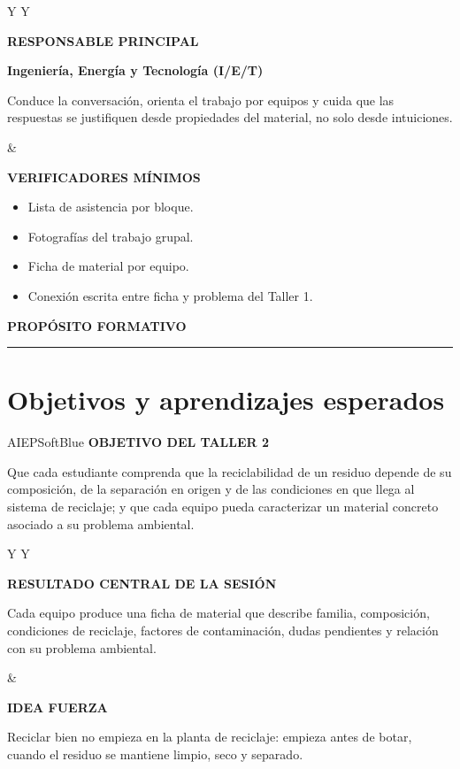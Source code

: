 ﻿\documentclass[10pt,a4paper]{article}
\newcommand{\kicker}[1]{%
  {\color{AIEPRed}\scriptsize\bfseries\MakeUppercase{#1}}\par\vspace{2.5mm}
  {\color{AIEPRed}\rule{13mm}{1.2pt}}\vspace{3mm}
}
\newcommand{\labeltext}[1]{%
  {\scriptsize\bfseries\color{AIEPSlate}\MakeUppercase{#1}}\par\vspace{1.3mm}
}
\newcommand{\pagebreaksection}{\newpage}
\begin{document}
\vspace{4mm}
\begin{tabularx}{\textwidth}{Y Y}
\begin{card}[height=35mm,valign=top]
\labeltext{Responsable principal}
{\bfseries\color{AIEPNavy}Ingeniería, Energía y Tecnología (I/E/T)}\par
Conduce la conversación, orienta el trabajo por equipos y cuida que las respuestas se justifiquen desde propiedades del material, no solo desde intuiciones.
\end{card}
&
\begin{card}[height=35mm,valign=top]
\labeltext{Verificadores mínimos}
\begin{itemize}
  \item Lista de asistencia por bloque.
  \item Fotografías del trabajo grupal.
  \item Ficha de material por equipo.
  \item Conexión escrita entre ficha y problema del Taller 1.
\end{itemize}
\end{card}
\end{tabularx}

\pagebreaksection

\kicker{Propósito formativo}
\section*{Objetivos y aprendizajes esperados}

\begin{softcard}{AIEPSoftBlue}
\labeltext{Objetivo del Taller 2}
Que cada estudiante comprenda que la reciclabilidad de un residuo depende de su composición, de la separación en origen y de las condiciones en que llega al sistema de reciclaje; y que cada equipo pueda caracterizar un material concreto asociado a su problema ambiental.
\end{softcard}

\vspace{3mm}
\begin{tabularx}{\textwidth}{Y Y}
\begin{card}[height=27mm,valign=top]
\labeltext{Resultado central de la sesión}
Cada equipo produce una ficha de material que describe familia, composición, condiciones de reciclaje, factores de contaminación, dudas pendientes y relación con su problema ambiental.
\end{card}
&
\begin{card}[height=27mm,valign=top]
\labeltext{Idea fuerza}
Reciclar bien no empieza en la planta de reciclaje: empieza antes de botar, cuando el residuo se mantiene limpio, seco y separado.
\end{card}
\end{tabularx}
\end{document}
